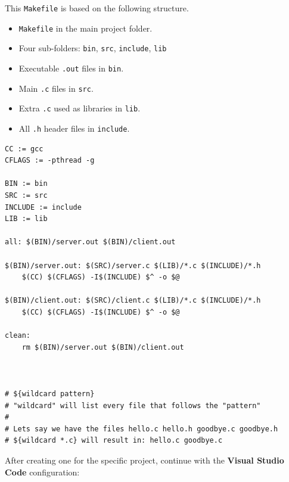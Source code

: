 This \texttt{Makefile} is based on the following structure.
\begin{itemize}
    \item \texttt{Makefile} in the main project folder.
    \item Four sub-folders: \texttt{bin}, \texttt{src}, \texttt{include}, \texttt{lib}
    \item Executable \texttt{.out} files in \texttt{bin}.
    \item Main \texttt{.c} files in \texttt{src}.
    \item Extra \texttt{.c} used as libraries in \texttt{lib}.
    \item All \texttt{.h} header files in \texttt{include}.
\end{itemize}

\begin{verbatim}
CC := gcc
CFLAGS := -pthread -g

BIN := bin
SRC := src
INCLUDE := include
LIB := lib

all: $(BIN)/server.out $(BIN)/client.out

$(BIN)/server.out: $(SRC)/server.c $(LIB)/*.c $(INCLUDE)/*.h
    $(CC) $(CFLAGS) -I$(INCLUDE) $^ -o $@

$(BIN)/client.out: $(SRC)/client.c $(LIB)/*.c $(INCLUDE)/*.h
    $(CC) $(CFLAGS) -I$(INCLUDE) $^ -o $@

clean:
    rm $(BIN)/server.out $(BIN)/client.out



# ${wildcard pattern}
# "wildcard" will list every file that follows the "pattern"
#
# Lets say we have the files hello.c hello.h goodbye.c goodbye.h
# ${wildcard *.c} will result in: hello.c goodbye.c
\end{verbatim}

After creating one for the specific project, continue with the \textbf{Visual Studio Code} configuration:

